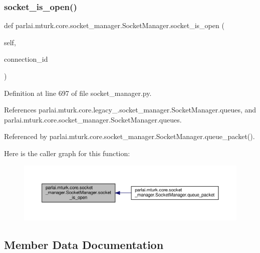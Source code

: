 \subsubsection{\texorpdfstring{socket\+\_\+is\+\_\+open()}{socket\_is\_open()}}
{\footnotesize\ttfamily def parlai.\+mturk.\+core.\+socket\+\_\+manager.\+Socket\+Manager.\+socket\+\_\+is\+\_\+open (\begin{DoxyParamCaption}\item[{}]{self,  }\item[{}]{connection\+\_\+id }\end{DoxyParamCaption})}



Definition at line 697 of file socket\+\_\+manager.\+py.



References parlai.\+mturk.\+core.\+legacy\+\_.\+socket\+\_\+manager.\+Socket\+Manager.\+queues, and parlai.\+mturk.\+core.\+socket\+\_\+manager.\+Socket\+Manager.\+queues.



Referenced by parlai.\+mturk.\+core.\+socket\+\_\+manager.\+Socket\+Manager.\+queue\+\_\+packet().

Here is the caller graph for this function\+:
\nopagebreak
\begin{figure}[H]
\begin{center}
\leavevmode
\includegraphics[width=350pt]{classparlai_1_1mturk_1_1core_1_1socket__manager_1_1SocketManager_a895934ce725c0770e94ff6ba0842078e_icgraph}
\end{center}
\end{figure}


\subsection{Member Data Documentation}
\mbox{\label{classparlai_1_1mturk_1_1core_1_1socket__manager_1_1SocketManager_a797b45ad87ca205c4e15ec3f76fdef46}} 
